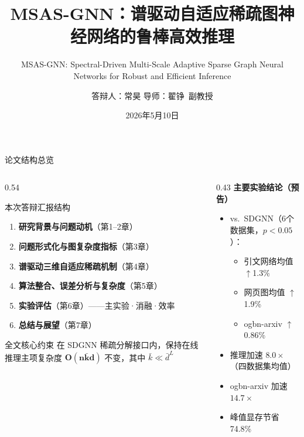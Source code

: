 \documentclass[aspectratio=169,9pt,xcolor=dvipsnames]{beamer}
\title[MSAS-GNN 答辩]{MSAS-GNN：谱驱动自适应稀疏图神经网络的鲁棒高效推理}
\subtitle{MSAS-GNN: Spectral-Driven Multi-Scale Adaptive Sparse Graph Neural Networks for Robust and Efficient Inference}
\author{答辩人：常昊 \quad 导师：翟铮\ 副教授}
\institute{北京师范大学\quad 统计学院}
\date{2026年5月10日}
\newcommand{\blue}[1]{\textcolor{mynavy}{#1}}
\newcommand{\green}[1]{\textcolor{mygreen}{#1}}
\newcommand{\kbar}{\ensuremath{\bar{k}}}
\begin{document}
\begin{frame}[plain]
  \titlepage
\end{frame}

\begin{frame}{论文结构总览}
  \begin{columns}[T]
    \begin{column}{0.54\textwidth}
      \begin{block}{本次答辩汇报结构}
        \begin{enumerate}\setlength{\itemsep}{3pt}
          \item \textbf{研究背景与问题动机}（第1--2章）
          \item \textbf{问题形式化与图复杂度指标}（第3章）
          \item \textbf{谱驱动三维自适应稀疏机制}（第4章）
          \item \textbf{算法整合、误差分析与复杂度}（第5章）
          \item \textbf{实验评估}（第6章）——主实验·消融·效率
          \item \textbf{总结与展望}（第7章）
        \end{enumerate}
      \end{block}
      \vspace{0.2cm}
      \begin{alertblock}{全文核心约束}
        \centering
        在 SDGNN 稀疏分解接口内，保持在线推理主项复杂度
        $\boldsymbol{O(n\kbar d)}$ 不变，其中 $\kbar\ll\bar{d}^L$
      \end{alertblock}
    \end{column}
    \begin{column}{0.43\textwidth}
      \textbf{\blue{主要实验结论（预告）}}
      \begin{itemize}\setlength{\itemsep}{3pt}
        \item vs.\ SDGNN（6个数据集，$p<0.05$）：
          \begin{itemize}
            \item 引文网络均值 \green{$\uparrow$1.3\%}
            \item 网页图均值 \green{$\uparrow$1.9\%}
            \item ogbn-arxiv \green{$\uparrow$0.86\%}
          \end{itemize}
        \item 推理加速 \blue{$8.0\times$}（四数据集均值）
        \item ogbn-arxiv 加速 \blue{$14.7\times$}
        \item 峰值显存节省 \blue{74.8\%}
      \end{itemize}
    \end{column}
  \end{columns}
\end{frame}
\end{document}
